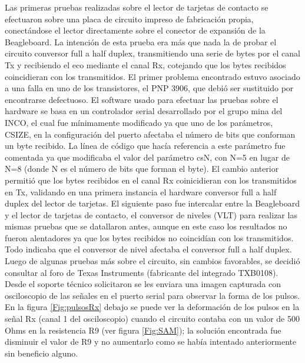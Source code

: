 Las primeras pruebas realizadas sobre el lector de tarjetas de contacto se efectuaron sobre una
placa de circuito impreso de fabricación propia, conectándose el lector directamente sobre el 
conector de expansión de la Beagleboard. La intención de esta prueba era más que nada la de probar
el circuito conversor full a half duplex, transmitiendo una serie de bytes por el canal Tx y recibiendo
el eco mediante el canal Rx, cotejando que los bytes recibidos coincidieran con los transmitidos. 
El primer problema encontrado estuvo asociado a una falla en uno de los transistores, el PNP 3906, 
que debió ser sustituido por encontrarse defectuoso.
El software usado para efectuar las pruebas sobre el hardware se basa en un controlador serial 
desarrollado por el grupo mina del INCO, el cual fue mínimamente modificado ya que uno de los 
parámetros, CSIZE, en la configuración del puerto afectaba el número de bits que conforman un byte recibido. 
La línea de código que hacía referencia a este parámetro fue comentada ya que modificaba el valor del parámetro 
csN, con N=5 en lugar de N=8 (donde N es el número de bits que forman el byte). 
El cambio anterior permitió que los bytes recibidos en el canal Rx coinicidieran con los transmitidos en Tx, 
validando en una primera instancia el hardware conversor full a half duplex del lector de tarjetas.
El siguiente paso fue intercalar entre la Beagleboard y el lector de tarjetas de contacto, el conversor de niveles (VLT) para realizar las mismas pruebas que se datallaron antes, aunque en este caso los resultados no fueron alentadores ya que los bytes recibidos no coincidían con los transmitidos. Todo indicaba que el conversor de nivel afectaba el conversor full a half duplex. Luego de algunas pruebas más sobre el circuito, sin cambios favorables, se decidió consultar al foro de Texas Instruments (fabricante del integrado TXB0108). Desde el soporte técnico solicitaron se les enviara una imagen capturada con osciloscopio de las señales en el puerto serial para observar la forma de los pulsos. En la figura \ref{Fig:pulsosRx} debajo se puede ver la deformación de los pulsos en la señal Rx (canal 1 del osciloscopio) cuando el circuito contaba con un valor de 500 Ohms en la resistencia R9 (ver figura \ref{Fig:SAM}); la solución encontrada fue disminuir el valor de R9 y no aumentarlo como se había intentado anteriormente sin beneficio alguno.

